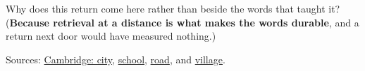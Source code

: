 \begin{tcolorbox}[breakable,colback=teal!4,colframe=teal!35!black,title={Before you move on}]
Why does this return come here rather than beside the words that taught it? (\textbf{Because retrieval at a distance is what makes the words durable}, and a return next door would have measured nothing.)

Sources: \href{https://dictionary.cambridge.org/dictionary/english-gujarati/city}{Cambridge: city}, \href{https://dictionary.cambridge.org/dictionary/english-gujarati/school}{school}, \href{https://dictionary.cambridge.org/dictionary/english-gujarati/road}{road}, and \href{https://dictionary.cambridge.org/dictionary/english-gujarati/village}{village}.
\end{tcolorbox}
